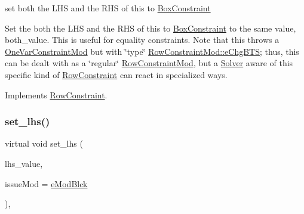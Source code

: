 set both the L\+HS and the R\+HS of this to \mbox{\hyperlink{class_s_m_spp__di__unipi__it_1_1_box_constraint}{Box\+Constraint}} 

Set the both the L\+HS and the R\+HS of this to \mbox{\hyperlink{class_s_m_spp__di__unipi__it_1_1_box_constraint}{Box\+Constraint}} to the same value, both\+\_\+value. This is useful for equality constraints. Note that this throws a \mbox{\hyperlink{class_s_m_spp__di__unipi__it_1_1_one_var_constraint_mod}{One\+Var\+Constraint\+Mod}} but with \char`\"{}type\char`\"{} \mbox{\hyperlink{class_s_m_spp__di__unipi__it_1_1_row_constraint_mod_af91e41a206e988d55a31347acd6f5d33a555ab61cc2e0ed36251cba947d2beccd}{Row\+Constraint\+Mod\+::e\+Chg\+B\+TS}}; thus, this can be dealt with as a \char`\"{}regular\char`\"{} \mbox{\hyperlink{class_s_m_spp__di__unipi__it_1_1_row_constraint_mod}{Row\+Constraint\+Mod}}, but a \mbox{\hyperlink{class_s_m_spp__di__unipi__it_1_1_solver}{Solver}} aware of this specific kind of \mbox{\hyperlink{class_s_m_spp__di__unipi__it_1_1_row_constraint}{Row\+Constraint}} can react in specialized ways. 

Implements \mbox{\hyperlink{class_s_m_spp__di__unipi__it_1_1_row_constraint_abe9589ef7ede6b4d5b0c0a1cbe72b5b7}{Row\+Constraint}}.

\mbox{\label{class_s_m_spp__di__unipi__it_1_1_box_constraint_a04d6bd47ee1aef8d3bfa2486b2732bd3}} 
\subsubsection{\texorpdfstring{set\+\_\+lhs()}{set\_lhs()}}
{\footnotesize\ttfamily virtual void set\+\_\+lhs (\begin{DoxyParamCaption}\item[{\mbox{\hyperlink{class_s_m_spp__di__unipi__it_1_1_row_constraint_a34abd4b01d3a2024be5f6d13dd88779f}{c\+\_\+\+R\+H\+S\+Value}}}]{lhs\+\_\+value,  }\item[{\mbox{\hyperlink{group___modification___t_y_p_e_s_ga544246d8c462e9a2d817c2c30797968f}{c\+\_\+\+Mod\+Param}}}]{issue\+Mod = {\ttfamily \mbox{\hyperlink{group___modification___t_y_p_e_s_gga48fddcdd03a03f49b7e389ca1ed938d4a21b14b26b1c0093a0905f6fc010bad29}{e\+Mod\+Blck}}} }\end{DoxyParamCaption})\hspace{0.3cm}{\ttfamily [override]}, {\ttfamily [virtual]}}



